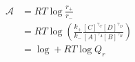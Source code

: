 \begin{eqnarray}\label{eqn:reaction-affinity-ratio}
\mathcal A &= RT\log\frac{r_+}{r_-} \\
& = RT\log\left(\frac{k_+}{k_-}\frac{[C]^{\gamma_C}[D]^{\gamma_D}}{[A]^{\gamma_A}[B]^{\gamma_B}}\right) \\
& = \log  + RT\log{Q_r} \\
\end{eqnarray}